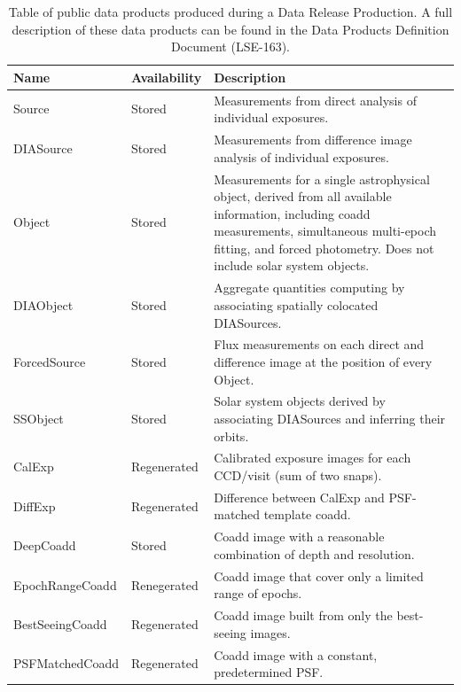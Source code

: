 \begin{table}
\small
\begin{tabularx}{\textwidth}{ | l | l | X | }
  \hline
  {\bf Name} & {\bf Availability} & {\bf Description} \\
  \hline
  Source & Stored &
  Measurements from direct analysis of individual exposures. \\
  \hline
  DIASource & Stored &
  Measurements from difference image analysis of individual exposures. \\
  \hline
  Object & Stored &
  Measurements for a single astrophysical object, derived from all available information, including coadd measurements, simultaneous multi-epoch fitting, and forced photometry.  Does not include solar system objects. \\
  \hline
  DIAObject& Stored &
  Aggregate quantities computing by associating spatially colocated DIASources. \\
  \hline
  ForcedSource & Stored &
  Flux measurements on each direct and difference image at the position of every Object. \\
  \hline
  SSObject & Stored &
  Solar system objects derived by associating DIASources and inferring their orbits. \\
  \hline
  CalExp & Regenerated &
  Calibrated exposure images for each CCD/visit (sum of two snaps). \\
  \hline
  DiffExp & Regenerated &
  Difference between CalExp and PSF-matched template coadd. \\
  \hline
  DeepCoadd & Stored &
  Coadd image with a reasonable combination of depth and resolution. \\
  \hline
  EpochRangeCoadd & Renegerated &
  Coadd image that cover only a limited range of epochs. \\
  \hline
  BestSeeingCoadd & Regenerated &
  Coadd image built from only the best-seeing images. \\
  \hline
  PSFMatchedCoadd & Regenerated &
  Coadd image with a constant, predetermined PSF. \\
  \hline
\end{tabularx}
\caption{Table of public data products produced during a Data Release Production.  A full description of these data products can be found in the Data Products Definition Document (LSE-163).
\label{table:drp_data_products}}
\end{table}

